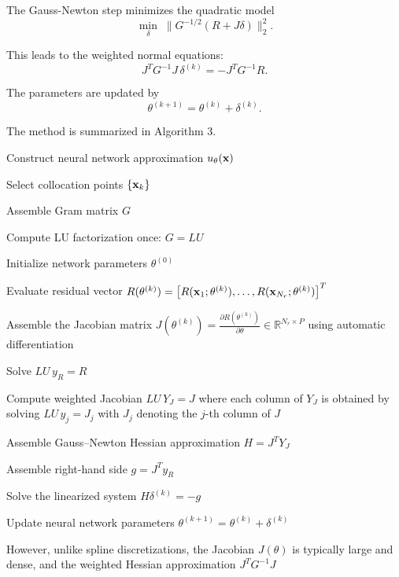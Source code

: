 \documentclass[review]{elsarticle}
\begin{document}
The Gauss-Newton step minimizes the quadratic model
\begin{equation}
\min_\delta
\;
\|
G^{-1/2}
(
R + J\delta
)
\|_2^2.
\end{equation}

This leads to the weighted normal equations:
\begin{equation}
J^T G^{-1} J \, \delta^{(k)}
=
-
J^T G^{-1} R.
\end{equation}

The parameters are updated by
\begin{equation}
\theta^{(k+1)}
=
\theta^{(k)}
+
\delta^{(k)}.
\end{equation}

The method is summarized in Algorithm 3.
\begin{algorithm}
\caption{Gauss--Newton Optimization for CRVPINNs}
\begin{algorithmic}[1]

\State Construct neural network approximation $u_\theta({\bf x})$

\State Select collocation points $\{{\bf x}_k\}$

\State Assemble Gram matrix $G$

\State Compute LU factorization once:
$
G = LU
$

\State Initialize network parameters $\theta^{(0)}$


    \State Evaluate residual vector
    $
    R(\theta^{(k)})
    =
    \left[
    R({\bf x}_1;\theta^{(k)}),
    \dots,
    R({\bf x}_{N_r};\theta^{(k)})
    \right]^T
    $

    \State Assemble the Jacobian matrix
    $
    J(\theta^{(k)})
    =
    \frac{\partial R(\theta^{(k)})}{\partial \theta}
    \in \mathbb{R}^{N_r \times P}
    $
    using automatic differentiation

    \State Solve
    $
    LU\, y_R = R
    $

    \State Compute weighted Jacobian
    $
    LU\, Y_J = J
    $
    where each column of $Y_J$ is obtained by solving
    $
    LU\, y_j = J_j
    $
    with $J_j$ denoting the $j$-th column of $J$

    \State Assemble Gauss--Newton Hessian approximation
    $
    H = J^T Y_J
    $

    \State Assemble right-hand side
    $
    g = J^T y_R
    $

    \State Solve the linearized system
    $
    H \delta^{(k)} = -g
    $

    \State Update neural network parameters
    $
    \theta^{(k+1)}
    =
    \theta^{(k)}
    +
    \delta^{(k)}
    $

\EndWhile


\end{algorithmic}
\end{algorithm}
However, unlike spline discretizations, the Jacobian
$J(\theta)$ is typically large and dense,
and the weighted Hessian approximation
$J^T G^{-1}J$
\end{document}
